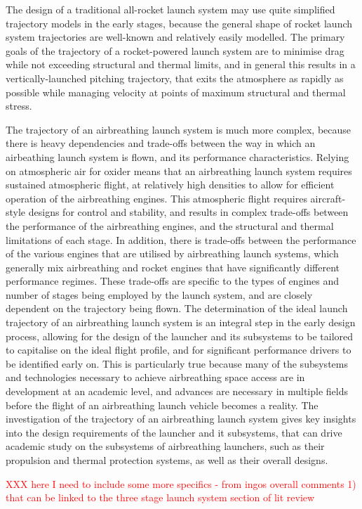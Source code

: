  
    The design of a traditional all-rocket launch system may use quite simplified trajectory models in the early stages, because the general shape of rocket launch system trajectories are well-known and relatively easily modelled.  The primary goals of the trajectory of a rocket-powered launch system are to minimise drag while not exceeding structural and thermal limits, and in general this results in a vertically-launched pitching trajectory, that exits the atmosphere as rapidly as possible while managing velocity at points of maximum structural and thermal stress. 
    
    The trajectory of an airbreathing launch system is much more complex, because there is heavy dependencies and trade-offs between the way in which an airbeathing launch system is flown, and its performance characteristics. Relying on atmospheric air for oxider means that an airbreathing launch system requires sustained atmospheric flight, at relatively high densities to allow for efficient operation of the airbreathing engines. This atmospheric flight requires aircraft-style designs for control and stability, and results in complex trade-offs between the performance of the airbreathing engines, and the structural and thermal limitations of each stage. In addition, there is trade-offs between the performance of the various engines that are utilised by airbreathing launch systems, which generally mix airbreathing and rocket engines that have significantly different performance regimes.
    These trade-offs are specific to the types of engines and number of stages being employed by the launch system, and are closely dependent on the trajectory being flown. The determination of the ideal launch trajectory of an airbreathing launch system is an integral step in the early design process, allowing for the design of the launcher and its subsystems to be tailored to capitalise on the ideal flight profile, and for significant performance drivers to be identified early on. 
  This is particularly true because many of the subsystems and technologies necessary to achieve airbreathing space access are in development at an academic level, and advances are necessary in multiple fields before the flight of an airbreathing launch vehicle becomes a reality. The investigation of the trajectory of an airbreathing launch system gives key insights into the design requirements of the launcher and it subsystems, that can drive academic study on the subsystems of airbreathing launchers, such as their propulsion and thermal protection systems, as well as their overall designs. 
    
    
    \textcolor{red}{XXX here I need to include some more specifics - from ingos overall comments 1) that can be linked to the three stage launch system section of lit review}
  